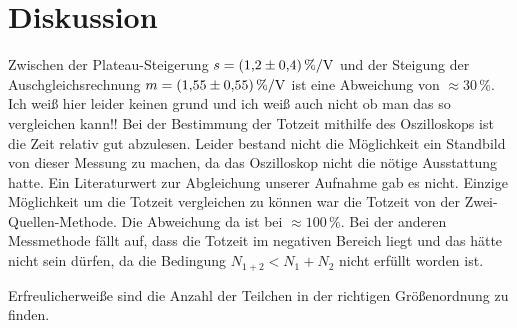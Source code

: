 \section{Diskussion}
Zwischen der Plateau-Steigerung $s = \SI{1.2 \pm 0.4}{\%\per\volt}$ und der Steigung der Auschgleichsrechnung
$m = \SI{1.55 \pm 0,55}{\%\per\volt}$ ist eine Abweichung von $\approx 30 \, \%$.
Ich weiß hier leider keinen grund und ich weiß auch nicht ob man das so vergleichen kann!!
\newline
Bei der Bestimmung der Totzeit mithilfe des Oszilloskops ist die Zeit relativ gut abzulesen.
Leider bestand nicht die Möglichkeit ein Standbild von dieser Messung zu machen, da das Oszilloskop nicht die nötige
Ausstattung hatte. Ein Literaturwert zur Abgleichung unserer Aufnahme gab es nicht.
Einzige Möglichkeit um die Totzeit vergleichen zu können war die Totzeit von der Zwei-Quellen-Methode.
Die Abweichung da ist bei $\approx 100 \, \%$.
Bei der anderen Messmethode fällt auf, dass die Totzeit im negativen Bereich liegt und das hätte nicht sein dürfen,
da die Bedingung $N_{1+2} < N_1 + N_2$ nicht erfüllt worden ist.

Erfreulicherweiße sind die Anzahl der Teilchen in der richtigen Größenordnung zu finden.
